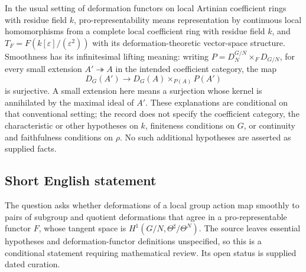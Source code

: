 \documentclass[11pt]{article}
\begin{document}
In the usual setting of deformation functors on local Artinian coefficient rings with residue field \(k\), pro-representability means representation by continuous local homomorphisms from a complete local coefficient ring with residue field \(k\), and \(T_F=F(k[\varepsilon]/(\varepsilon^2))\) with its deformation-theoretic vector-space structure. Smoothness has its infinitesimal lifting meaning: writing \(P=D_N^{G/N}\times_F D_{G/N}\), for every small extension \(A'\twoheadrightarrow A\) in the intended coefficient category, the map
\[
D_G(A')\longrightarrow D_G(A)\times_{P(A)}P(A')
\]
is surjective. A small extension here means a surjection whose kernel is annihilated by the maximal ideal of \(A'\). These explanations are conditional on that conventional setting; the record does not specify the coefficient category, the characteristic or other hypotheses on \(k\), finiteness conditions on \(G\), or continuity and faithfulness conditions on \(\rho\). No such additional hypotheses are asserted as supplied facts.
\subsection{Short English statement}
The question asks whether deformations of a local group action map smoothly to pairs of subgroup and quotient deformations that agree in a pro-representable functor \(F\), whose tangent space is \(H^1(G/N,\Theta^\sharp/\Theta^N)\). The source leaves essential hypotheses and deformation-functor definitions unspecified, so this is a conditional statement requiring mathematical review. Its open status is supplied dated curation.
\end{document}
